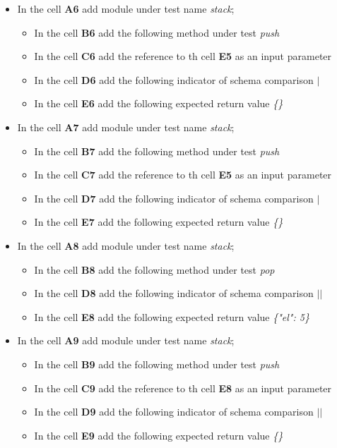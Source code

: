 \begin{itemize}
	\item In the cell \textbf{A6} add  module under test name \textit{stack};
	\begin{itemize}
		\item In the cell \textbf{B6} add the following method under test \textit{push}
		\item In the cell \textbf{C6} add the reference to th cell \textbf{E5} as an input parameter
		\item In the cell \textbf{D6} add the following indicator of schema comparison \textit{$|$}
		\item In the cell \textbf{E6} add the following expected return value \textit{\{\}}
	\end{itemize}
	
	\item In the cell \textbf{A7} add  module under test name \textit{stack};
	\begin{itemize}
		\item In the cell \textbf{B7} add the following method under test \textit{push}
		\item In the cell \textbf{C7} add the reference to th cell \textbf{E5} as an input parameter
		\item In the cell \textbf{D7} add the following indicator of schema comparison \textit{$|$}
		\item In the cell \textbf{E7} add the following expected return value \textit{\{\}}
	\end{itemize}
	
	\item In the cell \textbf{A8} add  module under test name \textit{stack};
	\begin{itemize}
		\item In the cell \textbf{B8} add the following method under test \textit{pop}
		\item In the cell \textbf{D8} add the following indicator of schema comparison \textit{$||$}
		\item In the cell \textbf{E8} add the following expected return value \textit{\{"el": 5\}}
	\end{itemize}
	
	\item In the cell \textbf{A9} add  module under test name \textit{stack};
	\begin{itemize}
		\item In the cell \textbf{B9} add the following method under test \textit{push}
		\item In the cell \textbf{C9} add the reference to th cell \textbf{E8} as an input parameter
		\item In the cell \textbf{D9} add the following indicator of schema comparison \textit{$||$}
		\item In the cell \textbf{E9} add the following expected return value \textit{\{\}}
	\end{itemize}
	

\end{itemize}

